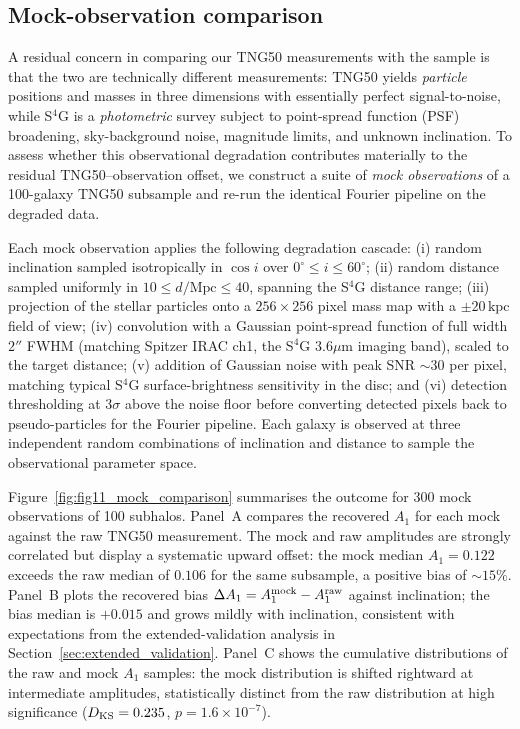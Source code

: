 \documentclass[fleqn,usenatbib]{mnras}
\newcommand{\Am}[1]{A_{#1}}
\newcommand{\kpc}{\,\mathrm{kpc}}
\newcommand{\Amone}{\ensuremath{\Am{1}}}
\begin{document}
\subsection{Mock-observation comparison}
\label{sec:mock_observations}

A residual concern in comparing our TNG50 measurements with the
\citet{2013ApJ...772..135Z} sample is that the two are technically
different measurements: TNG50 yields \emph{particle} positions and
masses in three dimensions with essentially perfect signal-to-noise,
while S$^{4}$G is a \emph{photometric} survey subject to point-spread
function (PSF) broadening, sky-background noise, magnitude limits,
and unknown inclination.  To assess whether this observational
degradation contributes materially to the residual TNG50--observation
offset, we construct a suite of \emph{mock observations} of a
100-galaxy TNG50 subsample and re-run the identical Fourier pipeline
on the degraded data.

Each mock observation applies the following degradation cascade:
(i) random inclination sampled isotropically in $\cos i$ over
$0^{\circ} \le i \le 60^{\circ}$; (ii) random distance sampled
uniformly in $10 \le d/\mathrm{Mpc} \le 40$, spanning the S$^{4}$G
distance range; (iii) projection of the stellar particles onto a
$256 \times 256$ pixel mass map with a $\pm 20\kpc$ field of view;
(iv) convolution with a Gaussian point-spread function of full width
$2''$ FWHM (matching Spitzer IRAC ch1, the S$^{4}$G $3.6\mu\mathrm{m}$
imaging band), scaled to the target distance; (v) addition of
Gaussian noise with peak SNR $\sim 30$ per pixel, matching typical
S$^{4}$G surface-brightness sensitivity in the disc; and (vi)
detection thresholding at $3\sigma$ above the noise floor before
converting detected pixels back to pseudo-particles for the
Fourier pipeline.  Each galaxy is observed at three independent
random combinations of inclination and distance to sample the
observational parameter space.

Figure~\ref{fig:fig11_mock_comparison} summarises the outcome for
300 mock observations of 100 subhalos.  Panel~A compares the
recovered $\Amone$ for each mock against the raw TNG50 measurement.
The mock and raw amplitudes are strongly correlated but display a
systematic upward offset: the mock median $\Amone = 0.122$ exceeds
the raw median of $0.106$ for the same subsample, a positive bias
of $\sim 15\%$.  Panel~B plots the recovered bias $\Delta \Amone
= \Amone^{\rm mock} - \Amone^{\rm raw}$ against inclination; the
bias median is $+0.015$ and grows mildly with inclination,
consistent with expectations from the extended-validation analysis
in Section~\ref{sec:extended_validation}.  Panel~C shows the
cumulative distributions of the raw and mock $\Amone$ samples: the
mock distribution is shifted rightward at intermediate amplitudes,
statistically distinct from the raw distribution at high
significance ($D_{\rm KS} = 0.235$, $p = 1.6 \times 10^{-7}$).
\end{document}
